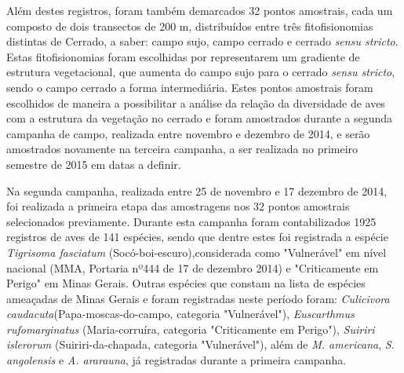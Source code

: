 Além destes registros, foram também demarcados 32 pontos amostrais,
cada um composto de dois transectos de 200 m, distribuídos entre três
fitofisionomias distintas de Cerrado, a saber: campo sujo, campo
cerrado e cerrado \textit{sensu stricto}. Estas fitofisionomias foram
escolhidas por representarem um gradiente de estrutura vegetacional,
que aumenta do campo sujo para o cerrado \textit{sensu stricto}, sendo
o campo cerrado a forma intermediária. Estes pontos amostrais foram
escolhidos de maneira a possibilitar a análise da relação da
diversidade de aves com a estrutura da vegetação no cerrado e foram
amostrados durante a segunda campanha de campo, realizada entre
novembro e dezembro de 2014, e serão amostrados novamente na terceira
campanha, a ser realizada no primeiro semestre de 2015 em datas a
definir.

Na segunda campanha, realizada entre 25 de novembro e 17 dezembro de
2014, foi realizada a primeira etapa das amostragens nos 32 pontos
amostrais selecionados previamente. Durante esta campanha foram
contabilizados 1925 registros de aves de 141 espécies, sendo que
dentre estes foi registrada a espécie \textit{Tigrisoma fasciatum}
(Socó-boi-escuro),considerada como "Vulnerável" em nível nacional
(MMA, Portaria nº444 de 17 de dezembro 2014) e "Criticamente em
Perigo" em Minas Gerais. Outras espécies que constam na lista de
espécies ameaçadas de Minas Gerais e foram registradas neste período
foram: \textit{Culicivora caudacuta}(Papa-moscas-do-campo, categoria
"Vulnerável"), \textit{Euscarthmus rufomarginatus} (Maria-corruíra,
categoria "Criticamente em Perigo"), \textit{Suiriri islerorum}
(Suiriri-da-chapada, categoria "Vulnerável"), além de
\textit{M. americana}, \textit{S. angolensis} e \textit{A. ararauna},
já registradas durante a primeira campanha.


